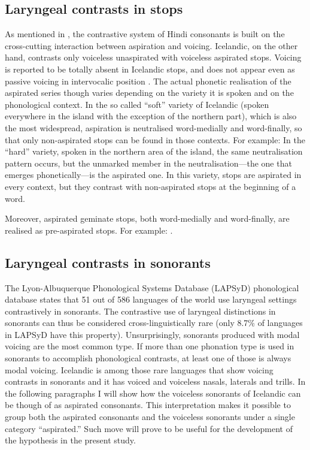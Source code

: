 \documentclass[11pt,a4paper,openany]{memoir}\usepackage[]{graphicx}\usepackage[]{color}
\begin{document}
\subsection{Laryngeal contrasts in stops}
As mentioned in , the contrastive system of Hindi consonants is built on the cross-cutting interaction between aspiration and voicing.
Icelandic, on the other hand, contrasts only voiceless unaspirated with voiceless aspirated stops.
Voicing is reported to be totally absent in Icelandic stops, and does not appear even as passive voicing in intervocalic position \citep{arnason2011}.
The actual phonetic realisation of the aspirated series though varies depending on the variety it is spoken and on the phonological context.
In the so called ``soft'' variety of Icelandic (spoken everywhere in the island with the exception of the northern part), which is also the most widespread, aspiration is neutralised word-medially and word-finally, so that only non-aspirated stops can be found in those contexts.
For example: 
In the ``hard'' variety, spoken in the northern area of the island, the same neutralisation pattern occurs, but the unmarked member in the neutralisation---the one that emerges phonetically---is the aspirated one.
In this variety, stops are aspirated in every context, but they contrast with non-aspirated stops at the beginning of a word.

Moreover, aspirated geminate stops, both word-medially and word-finally, are realised as pre-aspirated stops.
For example: .

\subsection{Laryngeal contrasts in sonorants}
The Lyon-Albuquerque Phonological Systems Database (LAPSyD) phonological data\-base \citep{Maddieson2012} states that 51 out of 586 languages of the world use laryngeal settings contrastively in sonorants.
The contrastive use of laryngeal distinctions in sonorants can thus be considered cross-linguistically rare (only 8.7\% of languages in LAPSyD have this property).
Unsurprisingly, sonorants produced with modal voicing are the most common type.
If more than one phonation type is used in sonorants to accomplish phonological contrasts, at least one of those is always modal voicing.
Icelandic is among those rare languages that show voicing contrasts in sonorants and it has voiced and voiceless nasals, laterals and trills.
In the following paragraphs I will show how the voiceless sonorants of Icelandic can be though of as aspirated consonants.
This interpretation makes it possible to group both the aspirated consonants and the voiceless sonorants under a single category ``aspirated.''
Such move will prove to be useful for the development of the hypothesis in the present study.
\end{document}
